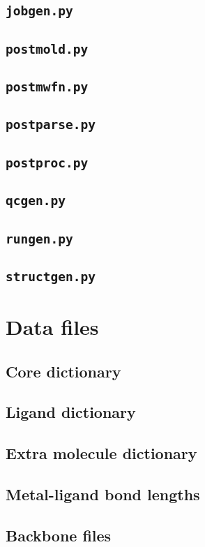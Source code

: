 \documentclass[a4paper,12pt]{assignment}
\begin{document}
\subsection{\texttt{jobgen.py}}

\subsection{\texttt{postmold.py}}

\subsection{\texttt{postmwfn.py}}

\subsection{\texttt{postparse.py}}

\subsection{\texttt{postproc.py}}

\subsection{\texttt{qcgen.py}}

\subsection{\texttt{rungen.py}}

\subsection{\texttt{structgen.py}}

\section{Data files}
\subsection{Core dictionary}

\subsection{Ligand dictionary}

\subsection{Extra molecule dictionary}

\subsection{Metal-ligand bond lengths}

\subsection{Backbone files}
\end{document}
